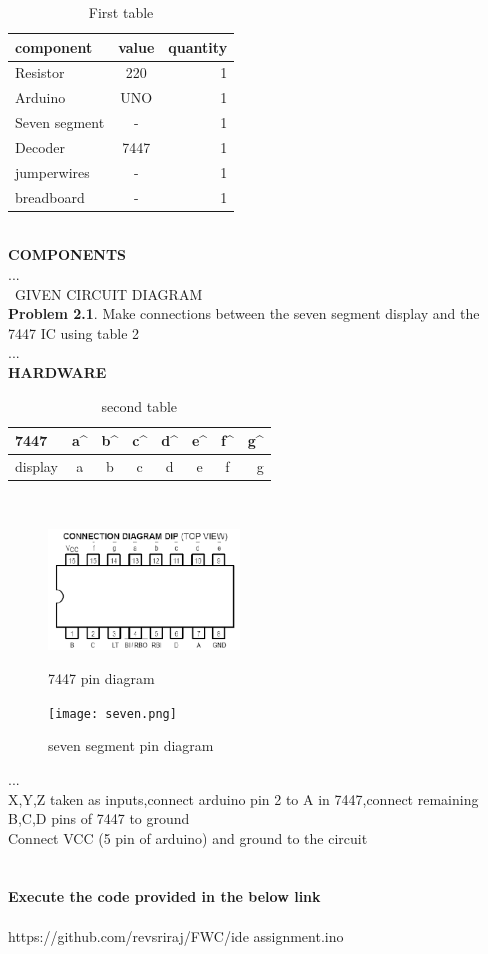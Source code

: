 \documentclass{article}
\begin{document}
 \begin{table}[ht]
            \centering
            \begin{tabular}{|l|c|r|}
            \hline
        component & value & quantity\\
        \hline

Resistor & 220 & 1\\
\hline
Arduino & UNO & 1\\
\hline
Seven segment & - & 1\\
\hline
Decoder & 7447& 1\\
\hline
jumperwires & - & 1\\
\hline
breadboard & - & 1\\
\hline
\end{tabular}
\caption{First table}
\label{tab:first table}
\end{table}\\
\textbf{COMPONENTS}\\
...\\\
GIVEN CIRCUIT DIAGRAM \\
\textbf{Problem 2.1}. Make connections between the seven
segment display  and the 7447 IC using table 2\\
...\\
\textbf{HARDWARE}
 \begin{table}[ht]
            \centering
            \begin{tabular}{|l|c|c|c|c|c|c|r|}
            \hline
            7447 & a^{\prime} & b^{\prime} & c^{\prime} & d^{\prime} & e^{\prime} & f^{\prime} & g^{\prime}\\
            \hline
            display & a & b & c & d & e & f & g\\
            \hline
            \end{tabular}
\caption{second table}
\label{tab:second table}
\end{table}\\
\begin{figure}[ht]
\centering
\begin{minipage}[b]{.49\textwidth}
    \includegraphics[width=2in]{7447.png}
    \caption{7447 pin diagram}
    \label{fig:7447 pin diagram}
     \end{minipage}
\begin{minipage}[b]{.49\textwidth}
    \texttt{[image: seven.png]}
    \caption{seven segment pin diagram}
    \label{fig:seven segment pin diagram}
     \end{minipage}
\end{figure}
...\\
X,Y,Z taken as inputs,connect arduino pin 2 to A in 7447,connect remaining B,C,D pins of 7447 to ground\\
Connect VCC (5 pin of arduino) and ground to the circuit
\\
\\
\\
\textbf{Execute the code provided in the below link}
\\
\\
https://github.com/revsriraj/FWC/ide assignment.ino
\end{document}

